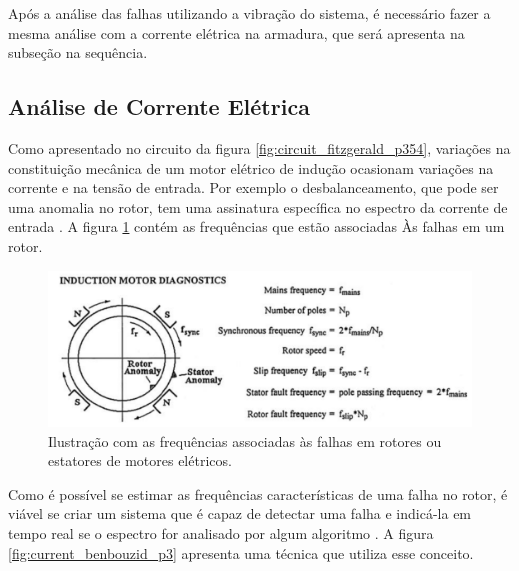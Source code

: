 Após a análise das falhas utilizando a vibração do sistema, é necessário fazer a mesma análise com a corrente elétrica na armadura, 
que será apresenta na subseção na sequência.


% 

\subsection{Análise de Corrente Elétrica }\label{sec:}

Como apresentado no circuito da figura \ref{fig:circuit_fitzgerald_p354}, variações na constituição mecânica de um motor elétrico de 
indução ocasionam variações na corrente e na tensão de entrada. Por exemplo o desbalanceamento, que pode ser uma anomalia no rotor,
tem uma assinatura específica no espectro da corrente de entrada \cite{Wu2013}.  A figura \ref{fig:fault_freq_randall_p55} contém as
frequências que estão associadas Às falhas em um rotor.

\begin{figure}[H]
    \caption{Ilustração com as frequências associadas às falhas em rotores ou estatores de motores elétricos.}
    \begin{center}
        \includegraphics[scale=.35]{referencial/img/fault_freq_randall_p55.png}
    \end{center}
    \label{fig:fault_freq_randall_p55}
\end{figure}

Como é possível se estimar as frequências características de uma falha no rotor, é viável se criar um sistema que é capaz de detectar uma 
falha e indicá-la em tempo real se o espectro for analisado por algum algoritmo \cite{El1999}. A figura \ref{fig:current_benbouzid_p3} apresenta uma
técnica que utiliza esse conceito.


